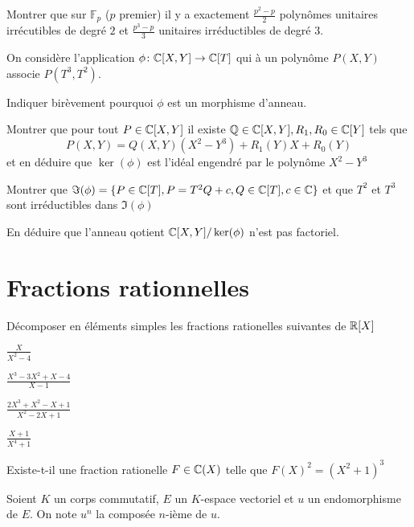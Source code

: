 \documentclass[french]{report}
\begin{document}
\begin{exo}
    Montrer que sur \(\mathbb{F}_p\) (\(p\) premier) il y a exactement \(\frac{p^2-p}{2}\)
    polynômes unitaires irrécutibles de degré \(2\) et \(\frac{p^3-p}{3}\) unitaires
    irréductibles de degré \(3\).
\end{exo}

\begin{exo}
    On considère l'application \(\phi\colon\mathbb{C}[X,Y]\to\mathbb{C}[T]\) qui à un polynôme
    \(P(X,Y)\) associe \(P(T^3,T^2)\).
    \begin{q}{1}
        Indiquer birèvement pourquoi \(\phi\) est un morphisme d'anneau.
    \end{q}
    \begin{q}{2}
        Montrer que pour tout \(P\in\mathbb{C}[X,Y]\) il existe \(\mathbb{Q}\in\mathbb{C}[X,Y],R_1,R_0\in\mathbb{C}[Y]\)
        tels que \[P(X,Y)=Q(X,Y)(X^2-Y^3)+R_1(Y)X+R_0(Y)\] et en déduire que \(\ker(\phi)\)
        est l'idéal engendré par le polynôme \(X^2-Y^3\)
    \end{q}
    \begin{q}{3}
        Montrer que \(\Im(\phi)=\{P\in\mathbb{C}[T],P=T^2Q+c,Q\in\mathbb{C}[T],c\in\mathbb{C}\}\) et que \(T^2\)
        et \(T^3\) sont irréductibles dans \(\Im(\phi)\)
    \end{q}
    \begin{q}{4}
        En déduire que l'anneau qotient \(\mathbb{C}[X,Y]/\ker(\phi)\) n'est pas factoriel.
    \end{q}
\end{exo}

\section*{Fractions rationnelles}

\begin{exo}
    Décomposer en éléments simples les fractions rationelles suivantes de \(\mathbb{R}[X]\)
    \begin{q}{1}
        \(\frac{X}{X^2-4}\)
    \end{q}
    \begin{q}{2}
        \(\frac{X^3-3X^2+X-4}{X-1}\)
    \end{q}
    \begin{q}{3}
        \(\frac{2X^3+X^2-X+1}{X^2-2X+1}\)
    \end{q}
    \begin{q}{4}
        \(\frac{X+1}{X^4+1}\)
    \end{q}
\end{exo}

\begin{exo}
    Existe-t-il une fraction rationelle \(F\in\mathbb{C}(X)\) telle que
    \(F(X)^2=\left(X^2+1\right)^3\)
\end{exo}

\begin{exo}
    Soient \(K\) un corps commutatif, \(E\) un \(K\)-espace vectoriel et \(u\) un
    endomorphisme de \(E\). On note \(u^n\) la composée \(n\)-ième de \(u\).
\end{exo}
\end{document}
